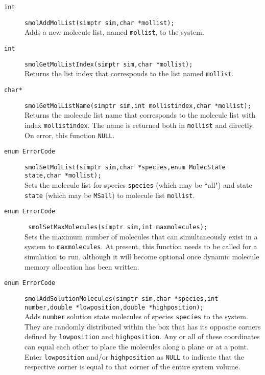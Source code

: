 \documentclass {book}
\begin{document}
\begin{description}
\item[\texttt{int}]
\texttt{smolAddMolList(simptr sim,char *mollist);}
\hfill \\
Adds a new molecule list, named \texttt{mollist}, to the system.

\item[\texttt{int}]
\texttt{smolGetMolListIndex(simptr sim,char *mollist);}
\hfill \\
Returns the list index that corresponds to the list named \texttt{mollist}.

\item[\texttt{char*}]
\texttt{smolGetMolListName(simptr sim,int mollistindex,char *mollist);}
\hfill \\
Returns the molecule list name that corresponds to the molecule list with index \texttt{mollistindex}. The name is returned both in \texttt{mollist} and directly. On error, this function \texttt{NULL}.

\item[\texttt{enum ErrorCode}]
\texttt{smolSetMolList(simptr sim,char *species,enum MolecState state,char *mollist);}
\hfill \\
Sets the molecule list for species \texttt{species} (which may be ``all") and state \texttt{state} (which may be \texttt{MSall}) to molecule list \texttt{mollist}.

\item[\texttt{enum ErrorCode}]
\texttt{ smolSetMaxMolecules(simptr sim,int maxmolecules);}
\hfill \\
Sets the maximum number of molecules that can simultaneously exist in a system to \texttt{maxmolecules}. At present, this function needs to be called for a simulation to run, although it will become optional once dynamic molecule memory allocation has been written.

\item[\texttt{enum ErrorCode}]
\texttt{smolAddSolutionMolecules(simptr sim,char *species,int number,double *lowposition,double *highposition);}
\hfill \\
Adds \texttt{number} solution state molecules of species \texttt{species} to the system. They are randomly distributed within the box that has its opposite corners defined by \texttt{lowposition} and \texttt{highposition}. Any or all of these coordinates can equal each other to place the molecules along a plane or at a point. Enter \texttt{lowposition} and/or \texttt{highposition} as \texttt{NULL} to indicate that the respective corner is equal to that corner of the entire system volume.


\end{description}
\end{document}
